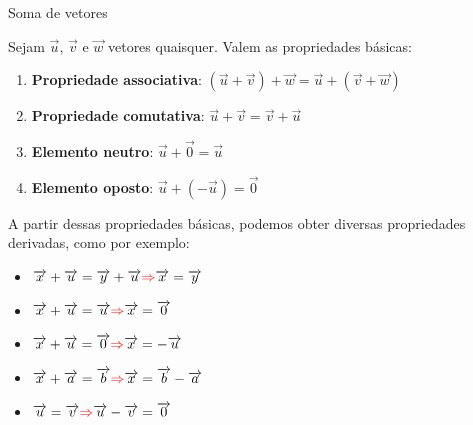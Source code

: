 \begin{frame}{Soma de vetores}

    Sejam \(\vec{u}\), \(\vec{v}\) e \(\vec{w}\) vetores quaisquer. Valem as propriedades básicas:

    \begin{enumerate}
        \item \textbf{Propriedade associativa}:
            \((\vec{u}+\vec{v})+\vec{w}=\vec{u}+(\vec{v}+\vec{w})\)
        \item \textbf{Propriedade comutativa}: \(\vec{u}+\vec{v}=\vec{v}+\vec{u}\)
        \item \textbf{Elemento neutro}: \(\vec{u}+\vec{0}=\vec{u}\)
        \item \textbf{Elemento oposto}: \(\vec{u}+(-\vec{u})=\vec{0}\)
    \end{enumerate}
    \pause
    A partir dessas propriedades básicas, podemos obter diversas propriedades derivadas, como por exemplo:
    \begin{itemize}
        \item \(\vec{x}+\vec{u}=\vec{y}+\vec{u} \textcolor{red}{\Rightarrow} \vec{x}=\vec{y}\)
        \item \(\vec{x}+\vec{u}=\vec{u} \textcolor{red}{\Rightarrow} \vec{x}=\vec{0}\)
        \item \(\vec{x}+\vec{u}=\vec{0} \textcolor{red}{\Rightarrow} \vec{x}=-\vec{u}\)
        \item \(\vec{x}+\vec{a}=\vec{b} \textcolor{red}{\Rightarrow} \vec{x}=\vec{b}-\vec{a}\)
        \item \(\vec{u}=\vec{v} \textcolor{red}{\Rightarrow} \vec{u}-\vec{v}=\vec{0}\)
    \end{itemize}
\end{frame}

